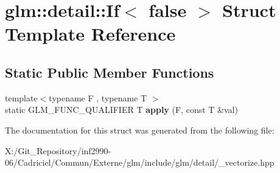 \hypertarget{structglm_1_1detail_1_1_if_3_01false_01_4}{\section{glm\-:\-:detail\-:\-:If$<$ false $>$ Struct Template Reference}
\label{structglm_1_1detail_1_1_if_3_01false_01_4}
}
\subsection*{Static Public Member Functions}
\begin{DoxyCompactItemize}
\item 
\hypertarget{structglm_1_1detail_1_1_if_3_01false_01_4_a31a9409e47dc11cb7d4251c12342b9f6}{{\footnotesize template$<$typename F , typename T $>$ }\\static G\-L\-M\-\_\-\-F\-U\-N\-C\-\_\-\-Q\-U\-A\-L\-I\-F\-I\-E\-R T {\bfseries apply} (F, const T \&val)}\label{structglm_1_1detail_1_1_if_3_01false_01_4_a31a9409e47dc11cb7d4251c12342b9f6}

\end{DoxyCompactItemize}


The documentation for this struct was generated from the following file\-:\begin{DoxyCompactItemize}
\item 
X\-:/\-Git\-\_\-\-Repository/inf2990-\/06/\-Cadriciel/\-Commun/\-Externe/glm/include/glm/detail/\-\_\-vectorize.\-hpp\end{DoxyCompactItemize}
